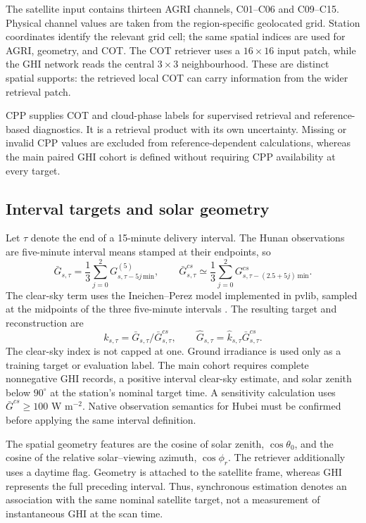 \documentclass[11pt]{article}
\begin{document}
The satellite input contains thirteen AGRI channels, C01--C06 and C09--C15. Physical channel values are taken from the region-specific geolocated grid. Station coordinates identify the relevant grid cell; the same spatial indices are used for AGRI, geometry, and COT. The COT retriever uses a $16\times16$ input patch, while the GHI network reads the central $3\times3$ neighbourhood. These are distinct spatial supports: the retrieved local COT can carry information from the wider retrieval patch.

CPP supplies COT and cloud-phase labels for supervised retrieval and reference-based diagnostics. It is a retrieval product with its own uncertainty. Missing or invalid CPP values are excluded from reference-dependent calculations, whereas the main paired GHI cohort is defined without requiring CPP availability at every target.

\subsection{Interval targets and solar geometry}
Let $\tau$ denote the end of a 15-minute delivery interval. The Hunan observations are five-minute interval means stamped at their endpoints, so
\begin{equation}
\bar G_{s,\tau}=\frac{1}{3}\sum_{j=0}^{2}G^{(5)}_{s,\tau-5j\,\mathrm{min}},
\qquad
\bar G^{cs}_{s,\tau}\simeq
\frac{1}{3}\sum_{j=0}^{2}G^{cs}_{s,\tau-(2.5+5j)\,\mathrm{min}} .
\label{eq:interval}
\end{equation}
The clear-sky term uses the Ineichen--Perez model implemented in pvlib, sampled at the midpoints of the three five-minute intervals \cite{ineichen,pvlibclear}. The resulting target and reconstruction are
\begin{equation}
k_{s,\tau}=\bar G_{s,\tau}/\bar G^{cs}_{s,\tau},
\qquad
\widehat G_{s,\tau}=\widehat k_{s,\tau}\bar G^{cs}_{s,\tau}.
\label{eq:kt}
\end{equation}
The clear-sky index is not capped at one. Ground irradiance is used only as a training target or evaluation label. The main cohort requires complete nonnegative GHI records, a positive interval clear-sky estimate, and solar zenith below $90^\circ$ at the station's nominal target time. A sensitivity calculation uses $\bar G^{cs}\geq100$ W m$^{-2}$. Native observation semantics for Hubei must be confirmed before applying the same interval definition.

The spatial geometry features are the cosine of solar zenith, $\cos\theta_0$, and the cosine of the relative solar--viewing azimuth, $\cos\phi_r$. The retriever additionally uses a daytime flag. Geometry is attached to the satellite frame, whereas GHI represents the full preceding interval. Thus, synchronous estimation denotes an association with the same nominal satellite target, not a measurement of instantaneous GHI at the scan time.
\end{document}
